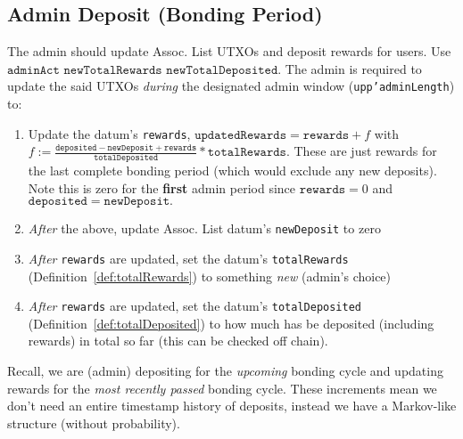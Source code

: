 \documentclass[10pt, a4paper]{article}
\theoremstyle{definition}
\begin{document}
\subsection{Admin Deposit (Bonding Period)}\label{subsection:adminDeposit}
The admin should update Assoc. List UTXOs and deposit rewards for users. Use \\ $\texttt{adminAct newTotalRewards newTotalDeposited}$.  The admin is required to update the said UTXOs \textit{during} the designated admin window (\texttt{upp'adminLength}) to:
\begin{enumerate}
\item{Update the datum's \texttt{rewards}, $\texttt{updatedRewards} = \texttt{rewards} + f $ with $f := \frac{\texttt{deposited} - \texttt{newDeposit} + \texttt{rewards}}{\texttt{totalDeposited}} * \texttt{totalRewards}$. These are just rewards for the last complete bonding period (which would exclude any new deposits). Note this is zero for the \textbf{first} admin period since $\texttt{rewards}=0$ and $\texttt{deposited} = \texttt{newDeposit}.$}
\item{\textit{After} the above, update Assoc. List datum's \texttt{newDeposit} to zero}
\item{\textit{After} \texttt{rewards} are updated, set the datum's \texttt{totalRewards} (Definition~\ref{def:totalRewards}) to something \textit{new} (admin's choice)}
\item{\textit{After} \texttt{rewards} are updated, set the datum's \texttt{totalDeposited} (Definition~\ref{def:totalDeposited}) to how much has be deposited (including rewards) in total so far (this can be checked off chain).}

\end{enumerate}

Recall, we are (admin) depositing for the \textit{upcoming} bonding cycle and updating rewards for the \textit{most recently passed} bonding cycle. These increments mean we don't need an entire timestamp history of deposits, instead we have a Markov-like structure (without probability).
\end{document}
